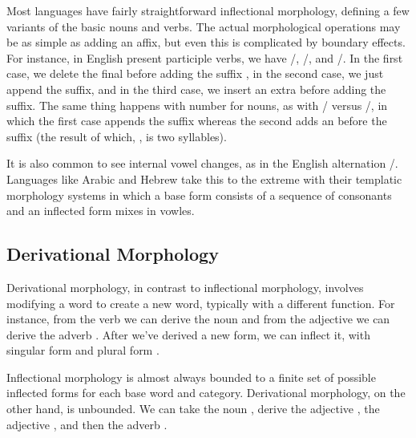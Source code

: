 Most languages have fairly straightforward inflectional morphology,
defining a few variants of the basic nouns and verbs.  The actual
morphological operations may be as simple as adding an affix, but even
this is complicated by boundary effects.  For instance, in English
present participle verbs, we have
/,
/, and /.
In the first case, we delete the final  before adding
the suffix , in the second case, we just append
the suffix, and in the third case, we insert an extra 
before adding the suffix.  The same thing happens with number for
nouns, as with / versus
/, in which the first case
appends the suffix  whereas the second adds an
 before the suffix (the result of which, ,
is two syllables).

It is also common to see internal vowel changes, as in the English
alternation /.  Languages
like Arabic and Hebrew take this to the extreme with their
templatic morphology systems in which a base form consists of
a sequence of consonants and an inflected form mixes in vowles.


\subsection{Derivational Morphology}

Derivational morphology, in contrast to inflectional morphology,
involves modifying a word to create a new word, typically with a
different function.  For instance, from the verb 
we can derive the noun  and from the adjective
 we can derive the adverb
.  After we've derived a new form, we can
inflect it, with singular form  and plural form
.

Inflectional morphology is almost always bounded to a finite set of
possible inflected forms for each base word and category.  Derivational
morphology, on the other hand, is unbounded.  We can take the noun
, derive the adjective ,
the adjective , and then the adverb
.  

